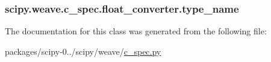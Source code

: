 \subsubsection[{type\+\_\+name}]{\setlength{\rightskip}{0pt plus 5cm}scipy.\+weave.\+c\+\_\+spec.\+float\+\_\+converter.\+type\+\_\+name}\label{classscipy_1_1weave_1_1c__spec_1_1float__converter_ae61554a19466577ae87c758ee007d03e}


The documentation for this class was generated from the following file\+:\begin{DoxyCompactItemize}
\item 
packages/scipy-\/0../scipy/weave/\hyperlink{c__spec_8py}{c\+\_\+spec.\+py}\end{DoxyCompactItemize}
